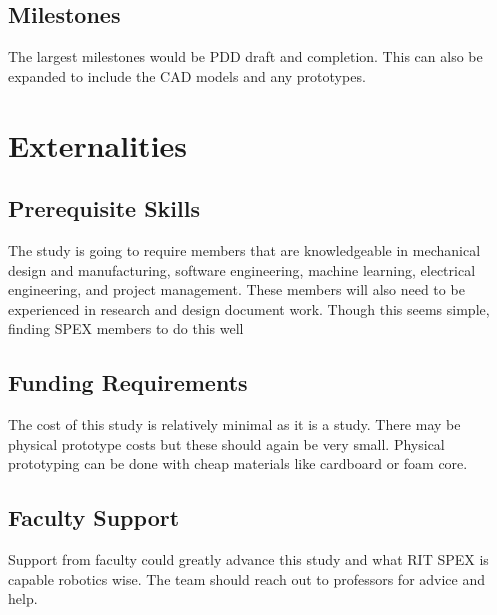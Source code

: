 \documentclass[conference]{IEEEtran} %
\begin{document}
\subsection{Milestones}
\label{subsec:milestones}
The largest milestones would be PDD draft and completion. This can also be expanded to include the CAD models and any prototypes. 

\section{Externalities}
\subsection{Prerequisite Skills}
The study is going to require members that are knowledgeable in mechanical design and manufacturing, software engineering, machine learning, electrical engineering, and project management. These members will also need to be experienced in research and design document work. Though this seems simple, finding SPEX members to do this well  

\subsection{Funding Requirements}

The cost of this study is relatively minimal as it is a study. 
There may be physical prototype costs but these should again be very small. 
Physical prototyping can be done with cheap materials like cardboard or foam core.  

\subsection{Faculty Support}
Support from faculty could greatly advance this study and what RIT SPEX is capable robotics wise. The team should reach out to professors for advice and help.
\end{document}
